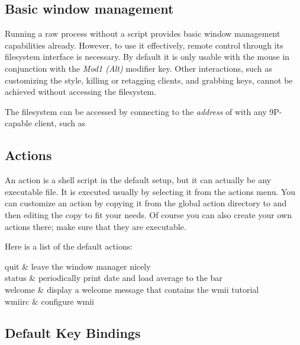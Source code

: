 \subsection{Basic window management}

Running a raw  process without a  script
provides basic window management capabilities already. However, to
use it effectively, remote control through its filesystem interface
is necessary.  By default it is only usable with the mouse in
conjunction with the \emph{Mod1 (Alt)} modifier key. Other
interactions, such as customizing the style, killing or retagging
clients, and grabbing keys, cannot be achieved without accessing the
filesystem.

The filesystem can be accessed by connecting to the \emph{address}
of  with any 9P-capable client, such as 

\subsection{Actions}

An action is a shell script in the default setup, but it can
actually be any executable file.  It is executed usually by
selecting it from the actions menu.  You can customize an action by
copying it from the global action directory
 to  and then
editing the copy to fit your needs.  Of course you can also create
your own actions there; make sure that they are executable.

Here is a list of the default actions:

\begin{Table}[]{2}
quit	& leave the window manager nicely \\
status	& periodically print date and load average to the bar \\
welcome	& display a welcome message that contains the wmii tutorial \\
wmiirc	& configure wmii \\
\end{Table}

\subsection{Default Key Bindings}
